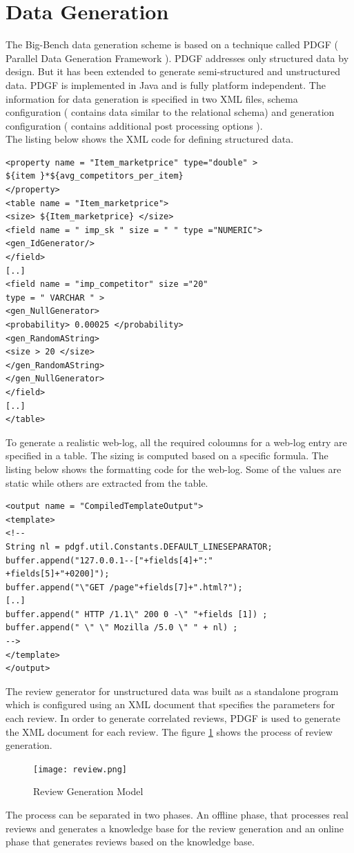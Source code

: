 \documentclass[12pt]{book}
\begin{document}
\section{Data Generation}
The Big-Bench data generation scheme is based on a technique called PDGF ( Parallel Data Generation Framework ). PDGF addresses only structured
data by design. But it has been extended to generate semi-structured and unstructured data. PDGF is implemented in Java and is fully
platform independent. The information for data generation is specified in two XML files, schema configuration ( contains data similar
to the relational schema) and generation configuration ( contains additional post processing options ).
\\\noindent
The listing below shows the XML code for defining structured data.
\begin{lstlisting}[frame=single]
<property name = "Item_marketprice" type="double" >
${item }*${avg_competitors_per_item}
</property>
<table name = "Item_marketprice">
<size> ${Item_marketprice} </size>
<field name = " imp_sk " size = " " type ="NUMERIC">
<gen_IdGenerator/>
</field>
[..]
<field name = "imp_competitor" size ="20"
type = " VARCHAR " >
<gen_NullGenerator>
<probability> 0.00025 </probability>
<gen_RandomAString>
<size > 20 </size>
</gen_RandomAString>
</gen_NullGenerator>
</field>
[..]
</table>
\end{lstlisting}
\noindent
To generate a realistic web-log, all the required  coloumns for a web-log entry are specified in a table.
The sizing is computed based on a specific formula. The listing below shows the formatting code for the web-log.
Some of the values are static while others are extracted from the table.
\\\noindent
\begin{lstlisting}[frame=single]
<output name = "CompiledTemplateOutput">
<template> 
<!--
String nl = pdgf.util.Constants.DEFAULT_LINESEPARATOR;
buffer.append("127.0.0.1--["+fields[4]+":"
+fields[5]+"+0200]");
buffer.append("\"GET /page"+fields[7]+".html?");
[..]
buffer.append(" HTTP /1.1\" 200 0 -\" "+fields [1]) ;
buffer.append(" \" \" Mozilla /5.0 \" " + nl) ;
-->
</template>
</output>
\end{lstlisting}
\noindent
The review generator for unstructured data was built as a standalone program which is configured using an XML document that 
specifies the parameters for each review. In order to generate correlated reviews, PDGF is used to generate the XML document
for each review.
The figure \ref{review} shows the process of review generation.
\begin{figure}[hb]
 \centering
 \texttt{[image: review.png]}
 \caption{Review Generation Model \label{review}}
\end{figure}
The process can be separated in two phases. An offline phase, that processes real reviews and generates a knowledge 
base for the review generation and an online phase that generates reviews based on the knowledge base.
\end{document}
